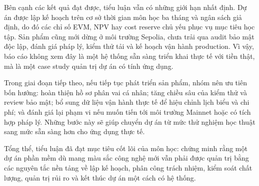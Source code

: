Bên cạnh các kết quả đạt được, tiểu luận vẫn có những giới hạn nhất định. Dự án được lập kế hoạch trên cơ sở thời gian môn học ba tháng và ngân sách giả định, do đó các chỉ số EVM, NPV hay cost reserve chủ yếu phục vụ mục tiêu học tập. Sản phẩm cũng mới dừng ở môi trường Sepolia, chưa trải qua audit bảo mật độc lập, đánh giá pháp lý, kiểm thử tải và kế hoạch vận hành production. Vì vậy, báo cáo không xem đây là một hệ thống sẵn sàng triển khai thực tế với tiền thật, mà là một case study quản trị dự án có tính ứng dụng.

Trong giai đoạn tiếp theo, nếu tiếp tục phát triển sản phẩm, nhóm nên ưu tiên bốn hướng: hoàn thiện hồ sơ phân vai cá nhân; tăng chiều sâu của kiểm thử và review bảo mật; bổ sung dữ liệu vận hành thực tế để hiệu chỉnh lịch biểu và chi phí; và đánh giá lại phạm vi nếu muốn tiến tới môi trường Mainnet hoặc có tích hợp pháp lý. Những bước này sẽ giúp chuyển dự án từ mức thử nghiệm học thuật sang mức sẵn sàng hơn cho ứng dụng thực tế.

Tổng thể, tiểu luận đã đạt mục tiêu cốt lõi của môn học: chứng minh rằng một dự án phần mềm dù mang màu sắc công nghệ mới vẫn phải được quản trị bằng các nguyên tắc nền tảng về lập kế hoạch, phân công trách nhiệm, kiểm soát chất lượng, quản trị rủi ro và kết thúc dự án một cách có hệ thống.
